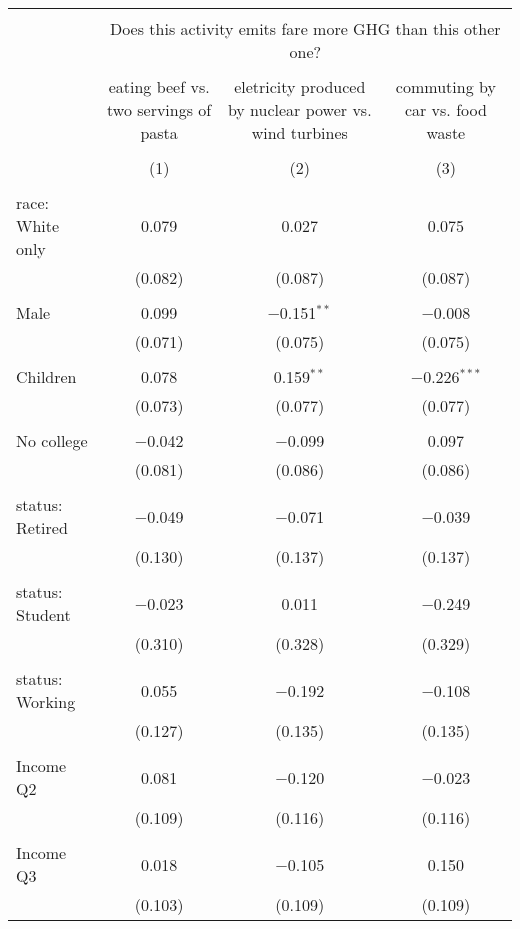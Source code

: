 
\begin{tabular}{@{\extracolsep{5pt}}lccc} 
\\[-1.8ex]\hline 
\hline \\[-1.8ex] 
 & \multicolumn{3}{c}{Does this activity emits fare more GHG than this other one?} \\ 
\cline{2-4} 
\\[-1.8ex] & eating beef vs. two servings of pasta & eletricity produced by nuclear power vs. wind turbines & commuting by car vs. food waste \\ 
\\[-1.8ex] & (1) & (2) & (3)\\ 
\hline \\[-1.8ex] 
 race: White only & 0.079 & 0.027 & 0.075 \\ 
  & (0.082) & (0.087) & (0.087) \\ 
  & & & \\ 
 Male & 0.099 & $-$0.151$^{**}$ & $-$0.008 \\ 
  & (0.071) & (0.075) & (0.075) \\ 
  & & & \\ 
 Children & 0.078 & 0.159$^{**}$ & $-$0.226$^{***}$ \\ 
  & (0.073) & (0.077) & (0.077) \\ 
  & & & \\ 
 No college & $-$0.042 & $-$0.099 & 0.097 \\ 
  & (0.081) & (0.086) & (0.086) \\ 
  & & & \\ 
 status: Retired & $-$0.049 & $-$0.071 & $-$0.039 \\ 
  & (0.130) & (0.137) & (0.137) \\ 
  & & & \\ 
 status: Student & $-$0.023 & 0.011 & $-$0.249 \\ 
  & (0.310) & (0.328) & (0.329) \\ 
  & & & \\ 
 status: Working & 0.055 & $-$0.192 & $-$0.108 \\ 
  & (0.127) & (0.135) & (0.135) \\ 
  & & & \\ 
 Income Q2 & 0.081 & $-$0.120 & $-$0.023 \\ 
  & (0.109) & (0.116) & (0.116) \\ 
  & & & \\ 
 Income Q3 & 0.018 & $-$0.105 & 0.150 \\ 
  & (0.103) & (0.109) & (0.109) \\ 

\end{tabular}
